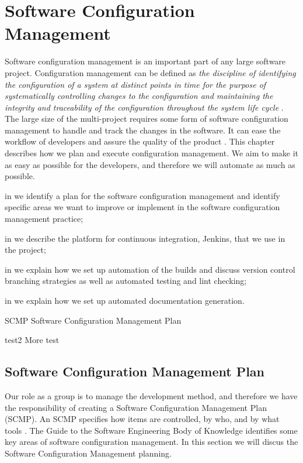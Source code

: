 \chapter{Software Configuration Management}\label{chap:config_management}
Software configuration management is an important part of any large software project. Configuration management can be defined as \emph{the discipline of identifying the configuration of a system at distinct points in time for the purpose of systematically controlling changes to the configuration and maintaining the integrity and traceability of the configuration throughout the system life cycle} \parencite[ch.6, p.6-1]{swebok}. The large size of the multi-project requires some form of software configuration management to handle and track the changes in the software. It can ease the workflow of developers and assure the quality of the product \parencite[ch.6]{swebok}. This chapter describes how we plan and execute configuration management. We aim to make it as easy as possible for the developers, and therefore we will automate as much as possible.

\begin{chapterorganization}
  \item in  we identify a plan for the software configuration management and identify specific areas we want to improve or implement in the software configuration management practice;
  \item in  we describe the platform for continuous integration, Jenkins, that we use in the project;
  \item in  we explain how we set up automation of the builds and discuss version control branching strategies as well as automated testing and lint checking;
  \item in  we explain how we set up automated documentation generation.
\end{chapterorganization}

\begin{abbreviations}
  \item[SCMP] Software Configuration Management Plan
  \item[test2] More test
\end{abbreviations}

\section{Software Configuration Management Plan}\label{sec:SCM_vision}
Our role as a group is to manage the development method, and therefore we have the responsibility of creating a Software Configuration Management Plan (SCMP). An SCMP specifies how items are controlled, by who, and by what tools \parencite[ch.6]{swebok}. The Guide to the Software Engineering Body of Knowledge \parencite[ch.6]{swebok} identifies some key areas of software configuration management. In this section we will discus the Software Configuration Management planning.

